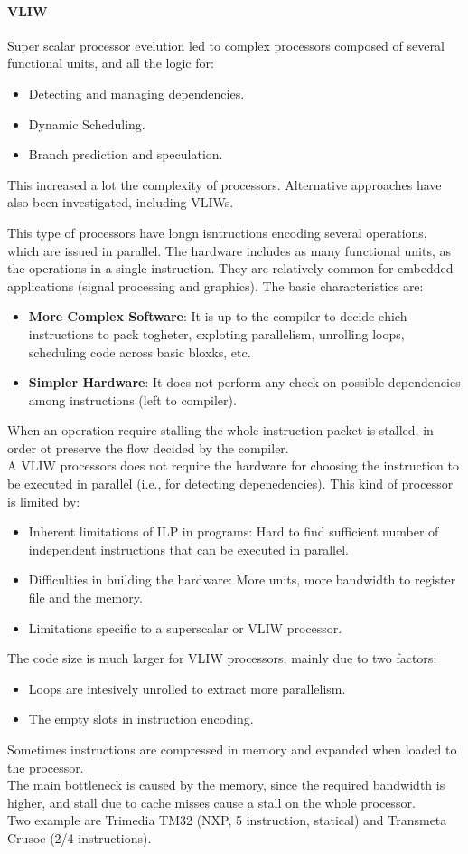 \documentclass[12pt]{article}
\begin{document}
\paragraph{VLIW} Super scalar processor evelution led to complex processors composed of several functional units, and all the logic for:
\begin{itemize}
  \item Detecting and managing dependencies.
  \item Dynamic Scheduling.
  \item Branch prediction and speculation.
\end{itemize}
This increased a lot the complexity of processors. Alternative approaches have also been investigated, including VLIWs.

This type of processors have longn isntructions encoding several operations, which are issued in parallel. The hardware includes as many functional units, as the operations in a single instruction. They are relatively common for embedded applications (signal processing and graphics).
The basic characteristics are:
\begin{itemize}
  \item \textbf{More Complex Software}: It is up to the compiler to decide ehich instructions to pack togheter, exploting parallelism, unrolling loops, scheduling code across basic bloxks, etc.
  \item \textbf{Simpler Hardware}: It does not perform any check on possible dependencies among instructions (left to compiler).
\end{itemize}
When an operation require stalling the whole instruction packet is stalled, in order ot preserve the flow decided by the compiler.\\
A VLIW processors does not require the hardware for choosing the instruction to be executed in parallel (i.e., for detecting depenedencies). This kind of processor is limited by:
\begin{itemize}
  \item Inherent limitations of ILP in programs: Hard to find sufficient number of independent instructions that can be executed in parallel.
  \item Difficulties in building the hardware: More units, more bandwidth to register file and the memory.
  \item Limitations specific to a superscalar or VLIW processor.
\end{itemize}
The code size is much larger for VLIW processors, mainly due to two factors:
\begin{itemize}
  \item Loops are intesively unrolled to extract more parallelism.
  \item The empty slots in instruction encoding.
\end{itemize}
Sometimes instructions are compressed in memory and expanded when loaded to the processor.\\
The main bottleneck is caused by the memory, since the required bandwidth is higher, and stall due to cache misses cause a stall on the whole processor.\\
Two example are Trimedia TM32 (NXP, 5 instruction, statical) and Transmeta Crusoe (2/4 instructions).
\end{document}
